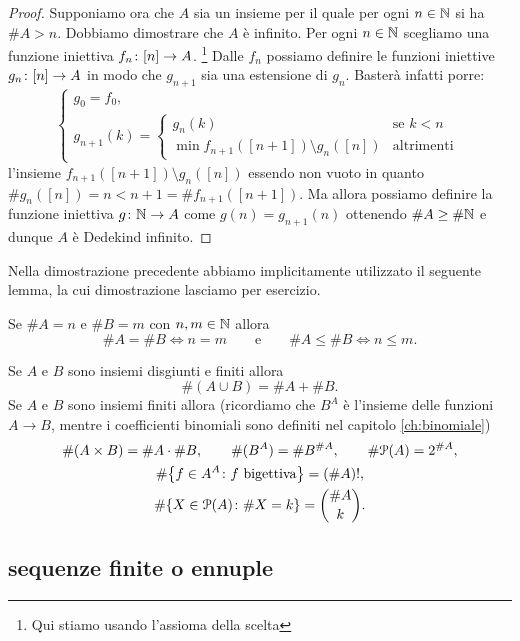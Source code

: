\begin{proof}
Supponiamo ora che $A$ sia un insieme per il quale per ogni $n\in {\mathbb N}$ 
si ha $\#A > n$. Dobbiamo dimostrare che $A$ è infinito.
Per ogni $n\in {\mathbb N}$ scegliamo
una funzione iniettiva $f_n\colon{\left[ n \right]}\to A$.
\footnote{Qui stiamo usando l'assioma della scelta}%
Dalle $f_n$ possiamo definire le funzioni iniettive $g_n\colon {\left[ n \right]}\to A$
in modo che $g_{n+1}$ sia una estensione di $g_n$.
Basterà infatti porre:
\[
  \begin{cases}
  g_0 = f_0,\\
  g_{n+1}(k) = \begin{cases}
    g_n(k) &\text{se $k<n$}\\
    \min f_{n+1}([n+1])\setminus g_n([n]) & \text{altrimenti}
    \end{cases}
  \end{cases}
\]
l'insieme $f_{n+1}([n+1])\setminus g_n([n])$ essendo non vuoto 
in quanto $\# g_n([n]) = n < n+1 = \# f_{n+1}([n+1])$.
Ma allora possiamo definire la funzione iniettiva $g\colon {\mathbb N} \to A$
come $g(n) = g_{n+1}(n)$ ottenendo $\#A \ge \#{\mathbb N}$ e dunque $A$ 
è Dedekind infinito.
\end{proof}

Nella dimostrazione precedente abbiamo implicitamente utilizzato il seguente lemma,
la cui dimostrazione lasciamo per esercizio.
\begin{lemma}
  Se $\#A = n$ e $\#B = m$ con $n,m\in {\mathbb N}$ allora 
  \[
    \#A = \#B \iff n=m
    \qquad \text{e}\qquad
    \#A \le \#B \iff n \le m.
  \]
\end{lemma}


\begin{exercise}
  \label{th:combinatoria}
  Se $A$ e $B$ sono insiemi disgiunti e finiti allora  
  \[
    \#(A\cup B) = \#A + \#B.
  \]
  Se $A$ e $B$ sono insiemi finiti allora 
  (ricordiamo che $B^A$ è l'insieme delle funzioni $A\to B$,
  mentre i coefficienti binomiali sono definiti nel capitolo
  \ref{ch:binomiale})
  \begin{gather*}
    \#(A \times B) = \#A\cdot \#B, \qquad
    \#(B^A) = \#B^{\#A}, \qquad
    \#\mathcal P(A) = 2^{\# A}, \\
    \#{\left\{ f\in A^A\colon \text{$f$ bigettiva} \right\}} = (\#A)!, \\
     \#{\left\{ X\in \mathcal P(A)\colon \#X = k \right\}}  
     = {\#A \choose k}. 
  \end{gather*}
\end{exercise}

\subsection{sequenze finite o ennuple}

